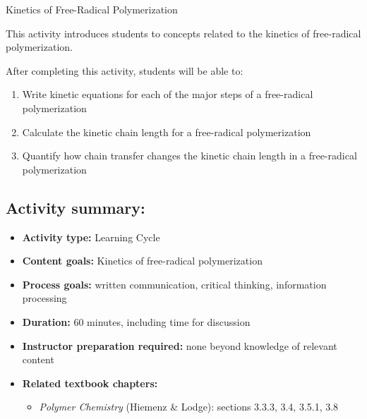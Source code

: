 %
%
%
%

\renewcommand{\figpath}{content}
\renewcommand{\labelbase}{FRPkinetics}

\begin{activity}{Kinetics of Free-Radical Polymerization}

\begin{instructornotes}
	This activity introduces students to concepts related to the kinetics of free-radical polymerization.
	
	After completing this activity, students will be able to:
	\begin{enumerate}
		\item Write kinetic equations for each of the major steps of a free-radical polymerization
		\item Calculate the kinetic chain length for a free-radical polymerization
		\item Quantify how chain transfer changes the kinetic chain length in a free-radical polymerization
	\end{enumerate}
	
	\subsection*{Activity summary:}
	\begin{itemize}
		\item \textbf{Activity type:} Learning Cycle
		\item \textbf{Content goals:} Kinetics of free-radical polymerization
		\item \textbf{Process goals:} %
			written communication, critical thinking, information processing
		\item \textbf{Duration:} 60 minutes, including time for discussion
		\item \textbf{Instructor preparation required:} none beyond knowledge of relevant content
		\item \textbf{Related textbook chapters:}
			\begin{itemize}
				\item \emph{Polymer Chemistry} (Hiemenz \& Lodge): sections 3.3.3, 3.4, 3.5.1, 3.8
			\end{itemize}
	\end{itemize}
	

\end{instructornotes}
\end{activity}

